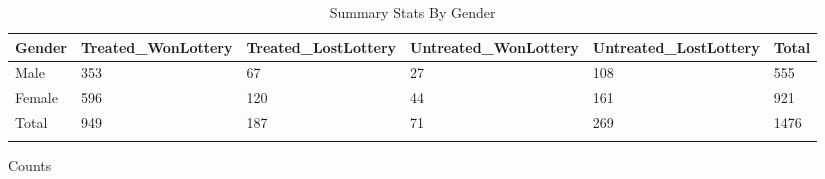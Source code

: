 \begin{table}[H] \centering
{}

\caption{Summary Stats By Gender}
\begin{tabularx}{18.5cm}{lCCCCC}

\toprule
{Gender}&{Treated\_WonLottery}&{Treated\_LostLottery}&{Untreated\_WonLottery}&{Untreated\_LostLottery}&{Total} \tabularnewline
\midrule\addlinespace[1.5ex]
Male&353&67&27&108&555 \tabularnewline
Female&596&120&44&161&921 \tabularnewline
Total&949&187&71&269&1476 \tabularnewline
\bottomrule \addlinespace[1.5ex]

\end{tabularx}
\begin{flushleft}
\footnotesize Counts
\end{flushleft}
\end{table}
